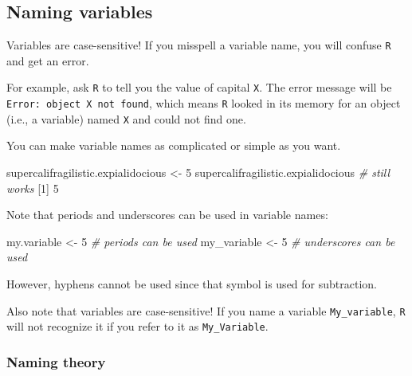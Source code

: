 \documentclass[
]{book}
\newenvironment{Shaded}{\begin{snugshade}}{\end{snugshade}}
\newcommand{\CommentTok}[1]{\textcolor[rgb]{0.56,0.35,0.01}{\textit{#1}}}
\newcommand{\DecValTok}[1]{\textcolor[rgb]{0.00,0.00,0.81}{#1}}
\newcommand{\NormalTok}[1]{#1}
\newcommand{\StringTok}[1]{\textcolor[rgb]{0.31,0.60,0.02}{#1}}
\begin{document}
\hypertarget{naming-variables}{%
\subsection*{Naming variables}\label{naming-variables}}

Variables are case-sensitive! If you misspell a variable name, you will confuse \texttt{R} and get an error.

For example, ask \texttt{R} to tell you the value of capital \texttt{X}. The error message will be \texttt{Error:\ object\ \textquotesingle{}X\textquotesingle{}\ not\ found}, which means \texttt{R} looked in its memory for an object (i.e., a variable) named \texttt{X} and could not find one.

You can make variable names as complicated or simple as you want.

\begin{Shaded}
\begin{Highlighting}[]
\NormalTok{supercalifragilistic.expialidocious <-}\StringTok{ }\DecValTok{5}
\NormalTok{supercalifragilistic.expialidocious  }\CommentTok{# still works}
\NormalTok{[}\DecValTok{1}\NormalTok{] }\DecValTok{5}
\end{Highlighting}
\end{Shaded}

Note that periods and underscores can be used in variable names:

\begin{Shaded}
\begin{Highlighting}[]
\NormalTok{my.variable <-}\StringTok{ }\DecValTok{5} \CommentTok{# periods can be used}
\NormalTok{my_variable <-}\StringTok{ }\DecValTok{5} \CommentTok{# underscores can be used}
\end{Highlighting}
\end{Shaded}

However, hyphens cannot be used since that symbol is used for subtraction.

Also note that variables are case-sensitive! If you name a variable \texttt{My\_variable}, \texttt{R} will not recognize it if you refer to it as \texttt{My\_Variable}.

\hypertarget{naming-theory}{%
\subsubsection*{Naming theory}\label{naming-theory}}
\end{document}
